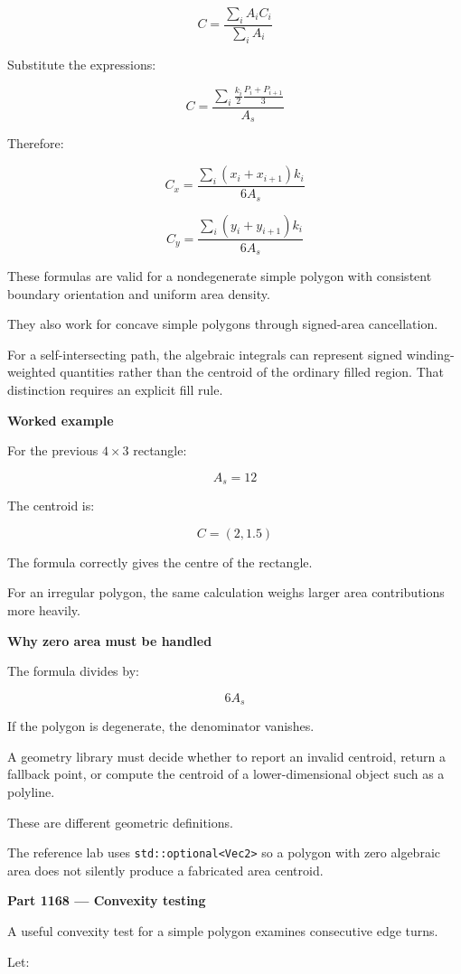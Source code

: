 \[
C=\frac{\sum_i A_iC_i}{\sum_i A_i}
\]

Substitute the expressions:

\[
C= \frac{ \sum_i \frac{k_i}{2}\frac{P_i+P_{i+1}}3 }{ A_s }
\]

Therefore:

\[
\boxed{ C_x= \frac{ \sum_i(x_i+x_{i+1})k_i }{ 6A_s } }
\]

\[
\boxed{ C_y= \frac{ \sum_i(y_i+y_{i+1})k_i }{ 6A_s } }
\]

These formulas are valid for a nondegenerate simple polygon with consistent boundary orientation and uniform area density.

They also work for concave simple polygons through signed-area cancellation.

For a self-intersecting path, the algebraic integrals can represent signed winding-weighted quantities rather than the centroid of the ordinary filled region. That distinction requires an explicit fill rule.

\textbf{Worked example}

For the previous \(4\times3\) rectangle:

\[
A_s=12
\]

The centroid is:

\[
\boxed{C=(2,1.5)}
\]

The formula correctly gives the centre of the rectangle.

For an irregular polygon, the same calculation weighs larger area contributions more heavily.

\textbf{Why zero area must be handled}

The formula divides by:

\[
6A_s
\]

If the polygon is degenerate, the denominator vanishes.

A geometry library must decide whether to report an invalid centroid, return a fallback point, or compute the centroid of a lower-dimensional object such as a polyline.

These are different geometric definitions.

The reference lab uses \texttt{std::optional\textless{}Vec2\textgreater{}} so a polygon with zero algebraic area does not silently produce a fabricated area centroid.

\textbf{Part 1168 --- Convexity testing}

A useful convexity test for a simple polygon examines consecutive edge turns.

Let:

